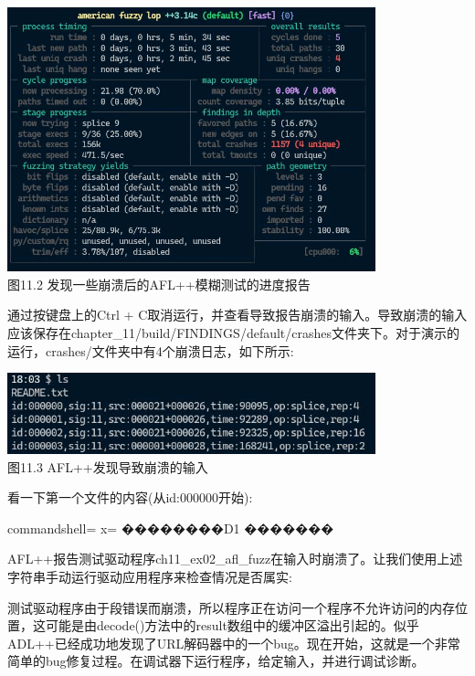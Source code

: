 \begin{center}
\includegraphics[width=0.8\textwidth]{content/2/chapter11/images/2.jpg}\\
图11.2 发现一些崩溃后的AFL++模糊测试的进度报告
\end{center}

通过按键盘上的Ctrl + C取消运行，并查看导致报告崩溃的输入。导致崩溃的输入应该保存在chapter\_11/build/FINDINGS/default/crashes文件夹下。对于演示的运行，crashes/文件夹中有4个崩溃日志，如下所示:

\begin{center}
\includegraphics[width=0.8\textwidth]{content/2/chapter11/images/3.jpg}\\
图11.3 AFL++发现导致崩溃的输入
\end{center}

看一下第一个文件的内容(从id:000000开始):

\begin{tcblisting}{commandshell={}}
x=%
��������D1%
�������%
\end{tcblisting}

AFL++报告测试驱动程序ch11\_ex02\_afl\_fuzz在输入时崩溃了。让我们使用上述字符串手动运行驱动应用程序来检查情况是否属实:


测试驱动程序由于段错误而崩溃，所以程序正在访问一个程序不允许访问的内存位置，这可能是由decode()方法中的result数组中的缓冲区溢出引起的。似乎ADL++已经成功地发现了URL解码器中的一个bug。现在开始，这就是一个非常简单的bug修复过程。在调试器下运行程序，给定输入，并进行调试诊断。








